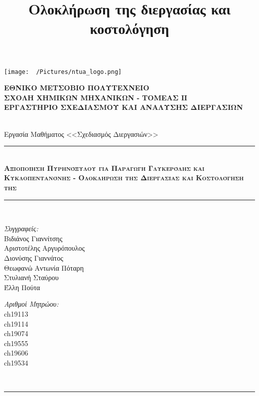 \documentclass[11pt]{article}
\date{}
\title{Ολοκλήρωση της διεργασίας και κοστολόγηση}
\newcommand{\HRule}{\rule{\linewidth}{0.5mm}}
\begin{document}
\renewcommand{\abstractname}{Περίληψη}
\renewcommand{\tablename}{Πίνακας}
\renewcommand{\figurename}{Σχήμα}
\renewcommand\listingscaption{Κώδικας}

\renewcommand{\contentsname}{Περιεχόμενα}
\begin{titlepage}

\begin{center}
  \begin{minipage}{0.15\textwidth}
    \begin{flushleft}
      \texttt{[image: ~/Pictures/ntua\_logo.png]}\\[0.4cm]    
    \end{flushleft}
  \end{minipage}
  \begin{minipage}{0.80\textwidth}
    \textsc{\bfseries \large ΕΘΝΙΚΟ ΜΕΤΣΟΒΙΟ ΠΟΛΥΤΕΧΝΕΙΟ}\\[0.2cm]
    \textsc{\bfseries \large ΣΧΟΛΗ ΧΗΜΙΚΩΝ ΜΗΧΑΝΙΚΩΝ - ΤΟΜΕΑΣ ΙΙ}\\[0.2cm]
    \textsc{\bfseries \normalsize ΕΡΓΑΣΤΗΡΙΟ ΣΧΕΔΙΑΣΜΟΥ ΚΑΙ ΑΝΑΛΥΣΗΣ ΔΙΕΡΓΑΣΙΩΝ}\\[0.2cm]
  \end{minipage}
  \\[1.5cm]

  \Large Εργασία Μαθήματος <<Σχεδιασμός Διεργασιών>>\\[1.5cm]
  \HRule \\[0.4cm]
  { \textsc{\huge \bfseries Αξιοποίηση Πυρηνόξυλου για Παραγωγή Γλυκερόλης και Κυκλοπεντανόνης - Ολοκλήρωση της Διεργασίας και Κοστολόγηση της}}\\[0.4cm]
  \HRule \\[3cm]

  \begin{minipage}{0.4\textwidth}
    \begin{flushleft} \large
      \emph{Συγγραφείς:}\\
      Βιδιάνος Γιαννίτσης\\
      Αριστοτέλης Αργυρόπουλος\\
      Διονύσης Γιαννάτος\\
      Θεωφανώ Αντωνία Πόταρη\\
      Στυλιανή Σταύρου\\
      Έλλη Πούτα
    \end{flushleft}
  \end{minipage}
  \begin{minipage}{0.4\textwidth}
    \begin{flushright} \large
      \emph{Αριθμοί Μητρώου:}\\
      ch19113\\
      ch19114\\
      ch19074\\
      ch19555\\
      ch19606\\
      ch19534
    \end{flushright}
  \end{minipage}\\[1cm]
  \HRule \\[2cm]


\end{center}
\end{titlepage}
\end{document}
